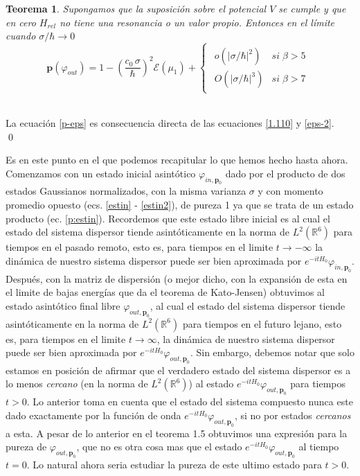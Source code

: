 \documentclass[12pt]{book}
\numberwithin{equation}{chapter}
\newtheorem{theorem}{Teorema}[chapter]
\def\n{\noindent}
\def\R{\mathbb{R}}
\def\E{\mathcal{E}}
\def\rar{\rightarrow}
\def\vp{\varphi}
\def\P{\mathbf{p}}
\begin{document}
\begin{theorem}
Supongamos que la suposici\'on sobre el potencial $V$ se cumple y que en cero $H_{rel}$ no tiene una resonancia o un valor propio. Entonces en el l\'imite cuando $\sigma/\hbar \rightarrow 0 $
\begin{equation}\label{p-eps}
\P(\vp_{out})= 1 - \left(\frac{c_{0} \, \sigma}{\hbar} \right)^{2}\E(\mu_{1}) +\begin{cases} \begin{matrix} o(|\sigma/\hbar|^{2}) & si\; \beta >5 \\ O(|\sigma/\hbar|^{3}) & si\; \beta > 7 \end{matrix} \end{cases}
\end{equation}

\end{theorem}
\n {\bf Demostraci\'on}\\
La ecuaci\'on \eqref{p-eps} es consecuencia directa de las ecuaciones \eqref{1.110} y \eqref{eps-2}.\\
\qed

\vspace{5 mm}

Es en este punto en el que podemos recapitular lo que hemos hecho hasta ahora.\\ Comenzamos con un estado inicial asint\'otico $\vp_{in,\P_{0}}$ dado por el producto de dos estados Gaussianos normalizados, con la misma varianza $\sigma$ y con momento promedio opuesto (ecs. \eqref{estin} - \eqref{estin2}), de pureza 1 ya que se trata de un estado producto (ec. \eqref{p:estin}). Recordemos que este estado libre inicial es al cual el estado del sistema dispersor tiende asint\'oticamente en la norma de $L^{2}(\R^{6})$ para tiempos en el pasado remoto, esto es, para tiempos en el limite $t \rar -\infty$ la din\'amica de nuestro sistema dispersor puede ser bien aproximada por $ e^{-itH_{0}} \vp_{in,\P_{0}}$.\\

Despu\'es, con la matriz de dispersi\'on (o mejor dicho, con la expansi\'on de esta en el limite de bajas energ\'ias que da el teorema de Kato-Jensen) obtuvimos al estado asint\'otico final libre $\vp_{out,\P_{0}}$, al cual el estado del sistema dispersor tiende asint\'oticamente en la norma de $L^{2}(\R^{6})$ para tiempos en el futuro lejano, esto es, para tiempos en el limite $t \rar \infty$, la din\'amica de nuestro sistema dispersor puede ser bien aproximada por $e^{-itH_{0}} \vp_{out,\P_{0}}$. Sin embargo, debemos notar que solo estamos en posici\'on de afirmar que el verdadero estado del sistema dispersor es a lo menos \emph{cercano} (en la norma de $L^{2}(\R^{6})$) al estado $ e^{-itH_{0}} \vp_{out,\P_{0}}$ para tiempos $t>0$. Lo anterior toma en cuenta que el estado del sistema compuesto nunca este dado exactamente por la funci\'on de onda $e^{-itH_{0}} \vp_{out,\P_{0}}$, si no por estados \emph{cercanos} a esta. A pesar de lo anterior en el teorema 1.5 obtuvimos una expresi\'on para la pureza de $ \vp_{out,\P_{0}}$, que no es otra cosa mas que el estado $e^{-itH_{0}} \vp_{out,\P_{0}}$ al tiempo $t=0$. Lo natural ahora seria estudiar la pureza de este ultimo estado para $t>0$.
\end{document}

